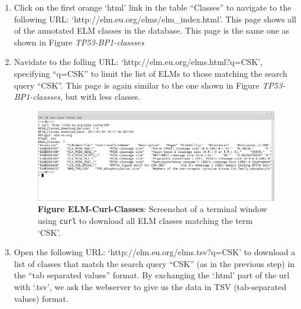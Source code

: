 \begin{enumerate}
\item Click on the first orange `html' link in the table ``Classes'' to
	navigate to the following URL:
	`http://elm.eu.org/elms/elm\_index.html'. This page shows all of the
	annotated ELM classes in the database. This page is the same one as
	shown in Figure \emph{TP53-BP1-classses}

\item Navidate to the folling URL: `http://elm.eu.org/elms.html?q=CSK',
	specifying ``q=CSK'' to limit the list of ELMs to those matching the
	search query ``CSK''. This page is again similar to the one shown in
	Figure \emph{TP53-BP1-classses}, but with less classes.


\begin{figure}[h!]
	\centering
	\includegraphics[width=\textwidth]{Figures/search_REST/elm_curl_classes_CSK.png}
	\caption{
	\textbf{Figure ELM-Curl-Classes}: Screenshot of a terminal window using
	\texttt{curl} to download all ELM classes matching the term `CSK'.
	}
	\label{fig:search_REST}
\end{figure}

\item Open the following URL: `http://elm.eu.org/elms.tsv?q=CSK' to download a
	list of classes that match the search query ``CSK'' (as in the previous
	step) in the ``tab separated values'' format. By exchanging the `.html'
	part of the url with `.tsv', we ask the webserver to give us the data
	in TSV (tab-separated values) format.



\end{enumerate}
